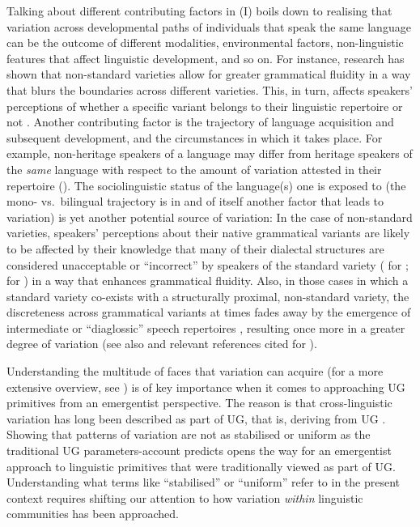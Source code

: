 \documentclass[output=paper]{langsci/langscibook}
\begin{document}
Talking about different contributing factors in (I) boils down to realising
that variation across developmental paths of individuals that speak the same
language can be the outcome of different modalities, environmental factors,
non-linguistic features that affect linguistic development, and so on. For
instance, research has shown that non-standard varieties allow for greater
grammatical fluidity in a way that blurs the boundaries across different
varieties. This, in turn, affects speakers’ perceptions of whether a specific
variant belongs to their linguistic repertoire or not
\parencite{CheSte1997,Henry2005}. Another contributing factor is the trajectory
of language acquisition and subsequent development, and the circumstances in
which it takes place. For example, non-heritage speakers of a language may
differ from heritage speakers of the \emph{same} language with respect to the
amount of variation attested in their repertoire
(\citealt{Montrul2002,Montrul2008,LohWes2016}). The sociolinguistic status of
the language(s) one is exposed to (the mono- vs.\  bilingual trajectory is in
and of itself another factor that leads to variation) is yet another potential
source of variation: In the case of non-standard varieties, speakers’
perceptions about their native grammatical variants are likely to be affected
by their knowledge that many of their dialectal structures are considered
unacceptable or \enquote{incorrect} by speakers of the standard variety
(\citealt{Henry2005} for ; \citealt{LeivadaEtAl2017a} for
) in a way that enhances grammatical fluidity. Also, in those
cases in which a standard variety co-exists with a structurally proximal,
non-standard variety, the discreteness across grammatical variants at times
fades away by the emergence of intermediate \citep{Cornips2006} or \enquote{diaglossic}
speech repertoires \citep{Auer2005}, resulting once more in a greater degree of
variation (see also \citealt{RowGro2014} and relevant references cited for
).

Understanding the multitude of faces that variation can acquire (for a more
extensive overview, see \citealt{Leivada2015a}) is of key importance when it
comes to approaching \gls{UG} primitives from an emergentist perspective. The
reason is that cross-linguistic variation has long been described as part of
\gls{UG}, that is, deriving from \gls{UG} . Showing that patterns of
variation are not as stabilised or uniform as the traditional \gls{UG}
parameters-account predicts opens the way for an emergentist approach to
linguistic primitives that were traditionally viewed as part of \gls{UG}.
Understanding what terms like \enquote{stabilised} or \enquote{uniform} refer to in the present
context requires shifting our attention to how variation \emph{within}
linguistic communities has been approached.
\end{document}
